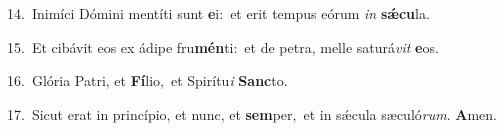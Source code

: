 {\numbfont\textcolor{\numbcolor}{14.}}~Inimíci Dómini mentíti sunt \textbf{e}\-i:~\star et erit tempus eórum \textit{in} \textbf{sǽ}\-\textbf{cu}la.\par
{\numbfont\textcolor{\numbcolor}{15.}}~Et cibávit eos ex ádipe fru\-\textbf{mén}\-ti:~\star et de petra, melle saturá\textit{vit} \textbf{e}\-os.\par
{\numbfont\textcolor{\numbcolor}{16.}}~Glória Patri, et \textbf{Fí}\-lio,~\star et Spirítu\textit{i} \textbf{Sanc}\-to.\par
{\numbfont\textcolor{\numbcolor}{17.}}~Sicut erat in princípio, et nunc, et \textbf{sem}\-per,~\star et in sǽcula sæculó\-\textit{rum}\-. \textbf{A}\-men.\par
